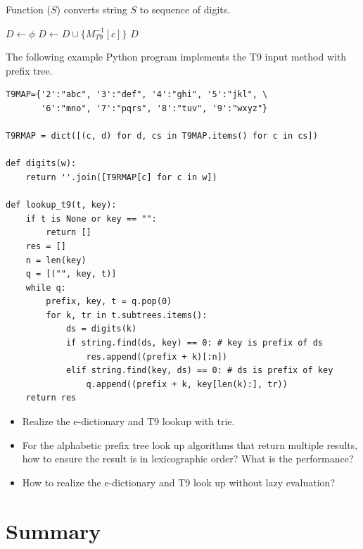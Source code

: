 \documentclass[b5paper]{article}
\begin{document}
Function ($S$) converts string $S$ to sequence of digits.

\begin{algorithmic}[1]
  \State $D \gets \phi$
    \State $D \gets D \cup \{M^{-1}_{T9}[c]\}$
  \EndFor
  \State \Return $D$
\EndFunction
\end{algorithmic}

The following example Python program implements the T9 input method with prefix tree.

\lstset{language=Python}
\begin{lstlisting}
T9MAP={'2':"abc", '3':"def", '4':"ghi", '5':"jkl", \
       '6':"mno", '7':"pqrs", '8':"tuv", '9':"wxyz"}

T9RMAP = dict([(c, d) for d, cs in T9MAP.items() for c in cs])

def digits(w):
    return ''.join([T9RMAP[c] for c in w])

def lookup_t9(t, key):
    if t is None or key == "":
        return []
    res = []
    n = len(key)
    q = [("", key, t)]
    while q:
        prefix, key, t = q.pop(0)
        for k, tr in t.subtrees.items():
            ds = digits(k)
            if string.find(ds, key) == 0: # key is prefix of ds
                res.append((prefix + k)[:n])
            elif string.find(key, ds) == 0: # ds is prefix of key
                q.append((prefix + k, key[len(k):], tr))
    return res
\end{lstlisting}


\begin{Exercise}
\begin{itemize}
\item Realize the e-dictionary and T9 lookup with trie.
\item For the alphabetic prefix tree look up algorithms that return multiple results, how to ensure the result is in lexicographic order? What is the performance?
\item How to realize the e-dictionary and T9 look up without lazy evaluation?
\end{itemize}
\end{Exercise}

\section{Summary}
\end{document}
